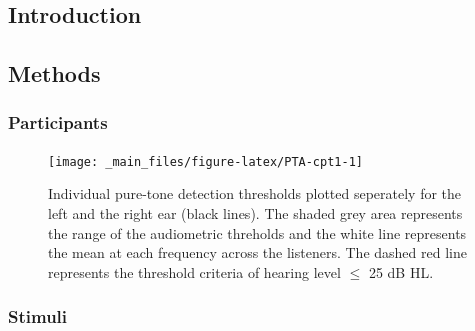 \documentclass[a4paper, twoside]{templates/ociamthesis}
\begin{document}
\hypertarget{introduction-2}{%
\subsection{Introduction}\label{introduction-2}}

\hypertarget{methods-2}{%
\subsection{Methods}\label{methods-2}}

\hypertarget{participants-2}{%
\subsubsection{Participants}\label{participants-2}}

\begin{figure}

{\centering \texttt{[image: \_main\_files/figure-latex/PTA-cpt1-1]} 

}

\caption{Individual pure-tone detection thresholds plotted seperately for the left and the right ear (black lines). The shaded grey area represents the range of the audiometric threholds and the white line represents the mean at each frequency across the listeners. The dashed red line represents the threshold criteria of hearing level $\leq$ 25 dB HL.}\label{fig:PTA-cpt1}
\end{figure}

\hypertarget{stimuli-2}{%
\subsubsection{Stimuli}\label{stimuli-2}}
\end{document}
